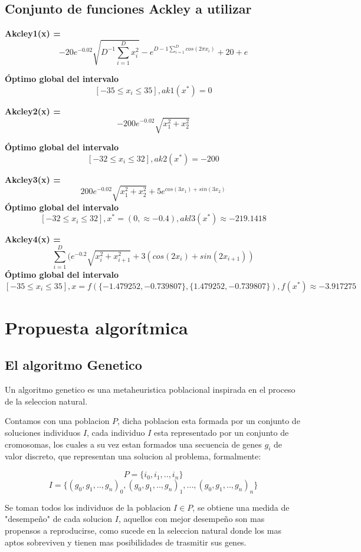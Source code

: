 \documentclass[10pt]{article}
\begin{document}
\subsection{Conjunto de funciones Ackley a utilizar}

\textbf{Akcley1(x) = } $$ -20e^{-0.02}\sqrt{D^{-1}\sum_{i=1}^{D}x_{i}^2}-e^{D-1\sum_{i=1}^{D}cos(2\pi x_i)}+20+e$$

\textbf{Óptimo global del intervalo} $$[-35\leq x_i \leq 35], ak1(x^*) = 0$$


\textbf{Akcley2(x) = } $$-200e^{-0.02}\sqrt{x_1^2+x_2^2}$$

\textbf{Óptimo global del intervalo} $$[-32\leq x_i \leq 32], ak2(x^*) = -200$$

\textbf{Akcley3(x) = } $$200e^{-0.02}\sqrt{x_1^2+x_2^2}+5e^{cos(3x_1)+sin(3x_2)}$$
\textbf{Óptimo global del intervalo} $$[-32\leq x_i \leq 32], x^* = (0, \approx -0.4), akl3(x^*) \approx -219.1418$$

\textbf{Akcley4(x) = } $$ \sum_{i=1}^{D}(e^{-0.2}\sqrt{x_i^2+x_{i+1}^2}+3(cos(2x_i)+sin(2x_{i+1}))$$
\textbf{Óptimo global del intervalo} $$[-35\leq x_i \leq 35], x=f(\{-1.479252,-0.739807\},\{1.479252,-0.739807\}), f(x^*) \approx -3.917275$$ 

\section{Propuesta algorítmica} %

\subsection{El algoritmo Genetico}

Un algoritmo genetico es una metaheuristica poblacional inspirada en el proceso de la seleccion natural.

Contamos con una poblacion $P$, dicha poblacion esta formada por un conjunto de soluciones individuos $I$, cada individuo $I$ esta representado por un conjunto de cromosomas, los cuales a su vez estan formados una secuencia de genes $g_i$ de valor discreto, que representan una solucion al problema, formalmente:

$$P =\{i_0,i_1,..,i_n\}$$
$$I =\{(g_0,g_1,..,g_n)_0,(g_0,g_1,..,g_n)_1,...,(g_0,g_1,..,g_n)_n\}$$

Se toman todos los individuos de la poblacion $I \in P$, se obtiene una medida de "desempeño" de cada solucion $I$, aquellos con mejor desempeño son mas propensos a reproducirse, como sucede en la seleccion natural donde los mas aptos sobreviven y tienen mas posibilidades de trasmitir sus genes.
\end{document}
